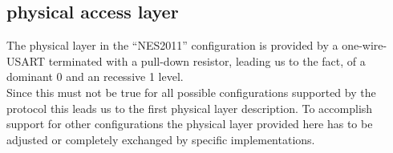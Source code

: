 \subsection{physical access layer}
\label{sec:bus:design:layer1}

The physical layer in the ``NES2011'' configuration is provided by a one-wire-USART terminated with a pull-down resistor, 
leading us to the fact, of a dominant 0 and an recessive 1 level.\\

Since this must not be true for all possible configurations supported by the protocol this leads
us to the first physical layer description. To accomplish support for other configurations the physical 
layer provided here has to be adjusted or completely exchanged by specific implementations.\\


